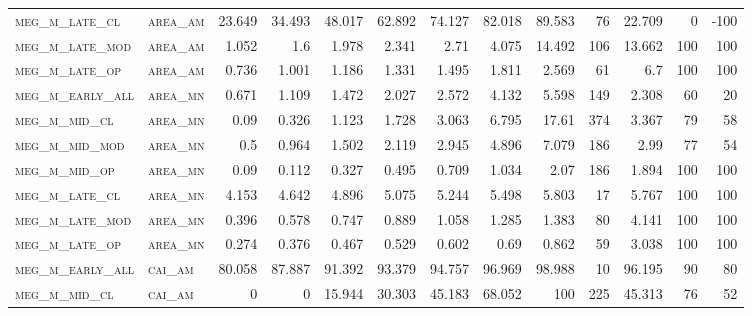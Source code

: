 \begin{landscape}
\begin{center}
\begin{footnotesize}
\begin{longtable}{llrrrrrrrr|rrr}
\textsc{meg\_m\_late\_cl  } & \textsc{area\_am  }   & 23.649   & 34.493   & 48.017   & 62.892   & 74.127   & 82.018   & 89.583    & 76     & 22.709        & 0             & -100            \\
\textsc{meg\_m\_late\_mod } & \textsc{area\_am  }   & 1.052    & 1.6      & 1.978    & 2.341    & 2.71     & 4.075    & 14.492    & 106    & 13.662        & 100           & 100             \\
\textsc{meg\_m\_late\_op  } & \textsc{area\_am  }   & 0.736    & 1.001    & 1.186    & 1.331    & 1.495    & 1.811    & 2.569     & 61     & 6.7           & 100           & 100             \\
\textsc{meg\_m\_early\_all} & \textsc{area\_mn  }   & 0.671    & 1.109    & 1.472    & 2.027    & 2.572    & 4.132    & 5.598     & 149    & 2.308         & 60            & 20              \\
\textsc{meg\_m\_mid\_cl   } & \textsc{area\_mn  }   & 0.09     & 0.326    & 1.123    & 1.728    & 3.063    & 6.795    & 17.61     & 374    & 3.367         & 79            & 58              \\
\textsc{meg\_m\_mid\_mod  } & \textsc{area\_mn  }   & 0.5      & 0.964    & 1.502    & 2.119    & 2.945    & 4.896    & 7.079     & 186    & 2.99          & 77            & 54              \\
\textsc{meg\_m\_mid\_op   } & \textsc{area\_mn  }   & 0.09     & 0.112    & 0.327    & 0.495    & 0.709    & 1.034    & 2.07      & 186    & 1.894         & 100           & 100             \\
\textsc{meg\_m\_late\_cl  } & \textsc{area\_mn  }   & 4.153    & 4.642    & 4.896    & 5.075    & 5.244    & 5.498    & 5.803     & 17     & 5.767         & 100           & 100             \\
\textsc{meg\_m\_late\_mod } & \textsc{area\_mn  }   & 0.396    & 0.578    & 0.747    & 0.889    & 1.058    & 1.285    & 1.383     & 80     & 4.141         & 100           & 100             \\
\textsc{meg\_m\_late\_op  } & \textsc{area\_mn  }   & 0.274    & 0.376    & 0.467    & 0.529    & 0.602    & 0.69     & 0.862     & 59     & 3.038         & 100           & 100             \\
\textsc{meg\_m\_early\_all} & \textsc{cai\_am   }   & 80.058   & 87.887   & 91.392   & 93.379   & 94.757   & 96.969   & 98.988    & 10     & 96.195        & 90            & 80              \\
\textsc{meg\_m\_mid\_cl   } & \textsc{cai\_am   }   & 0        & 0        & 15.944   & 30.303   & 45.183   & 68.052   & 100       & 225    & 45.313        & 76            & 52              \\

\end{longtable}
\end{footnotesize}
\end{center}
\end{landscape}
